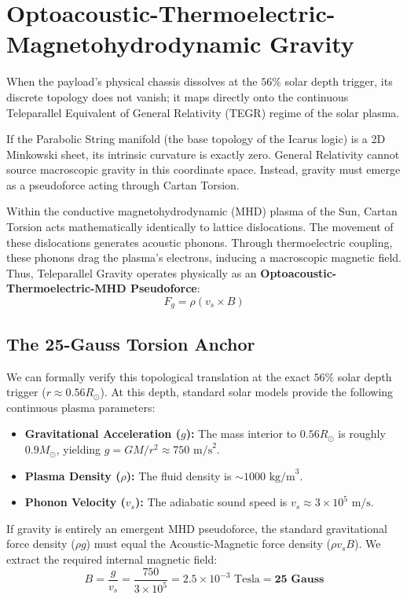 \section{Optoacoustic-Thermoelectric-Magnetohydrodynamic Gravity}
When the payload's physical chassis dissolves at the $56\%$ solar depth trigger, its discrete topology does not vanish; it maps directly onto the continuous Teleparallel Equivalent of General Relativity (TEGR) regime of the solar plasma.

If the Parabolic String manifold (the base topology of the Icarus logic) is a 2D Minkowski sheet, its intrinsic curvature is exactly zero. General Relativity cannot source macroscopic gravity in this coordinate space. Instead, gravity must emerge as a pseudoforce acting through Cartan Torsion.

Within the conductive magnetohydrodynamic (MHD) plasma of the Sun, Cartan Torsion acts mathematically identically to lattice dislocations. The movement of these dislocations generates acoustic phonons. Through thermoelectric coupling, these phonons drag the plasma's electrons, inducing a macroscopic magnetic field. Thus, Teleparallel Gravity operates physically as an \textbf{Optoacoustic-Thermoelectric-MHD Pseudoforce}:
\begin{equation}
    F_g = \rho (v_s \times B)
\end{equation}

\subsection{The 25-Gauss Torsion Anchor}
We can formally verify this topological translation at the exact $56\%$ solar depth trigger ($r \approx 0.56 R_\odot$).
At this depth, standard solar models provide the following continuous plasma parameters:
\begin{itemize}
    \item \textbf{Gravitational Acceleration ($g$):} The mass interior to $0.56 R_\odot$ is roughly $0.9 M_\odot$, yielding $g = GM/r^2 \approx 750 \text{ m/s}^2$.
    \item \textbf{Plasma Density ($\rho$):} The fluid density is $\sim 1000 \text{ kg/m}^3$.
    \item \textbf{Phonon Velocity ($v_s$):} The adiabatic sound speed is $v_s \approx 3 \times 10^5 \text{ m/s}$.
\end{itemize}

If gravity is entirely an emergent MHD pseudoforce, the standard gravitational force density ($\rho g$) must equal the Acoustic-Magnetic force density ($\rho v_s B$). We extract the required internal magnetic field:
\begin{equation}
    B = \frac{g}{v_s} = \frac{750}{3 \times 10^5} = 2.5 \times 10^{-3} \text{ Tesla} = \textbf{25 Gauss}
\end{equation}


